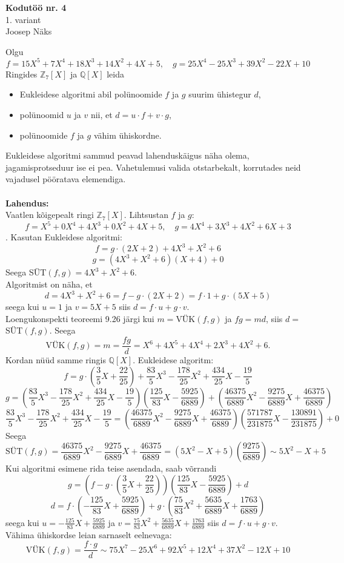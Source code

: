 \documentclass{article}
\begin{document}
\begin{center}
\Large\textbf{Kodutöö nr. 4}\\
1. variant\\
\small{Joosep Näks}
\end{center}
Olgu $$f=15X^5+7X^4+18X^3+14X^2+4X+5,\quad g=25X^4-25X^3+39X^2-22X+10$$ Ringides $\mathbb{Z}_7[X]$ ja $\mathbb{Q}[X]$ leida
\begin{itemize}
\item Eukleidese algoritmi abil polünoomide $f$ ja $g$ suurim ühistegur $d$,
\item polünoomid $u$ ja $v$ nii, et $d=u\cdot f+v\cdot g$,
\item polünoomide $f$ ja $g$ vähim ühiskordne.
\end{itemize}
Eukleidese algoritmi sammud peavad lahenduskäigus näha olema, jagamisprotseduur ise ei pea. Vahetulemusi valida otstarbekalt, korrutades neid vajadusel pööratava elemendiga.\\\\
\textbf{Lahendus:}\\
Vaatlen kõigepealt ringi $\mathbb{Z}_7[X]$. Lihtsustan $f$ ja $g$:$$f=X^5+0X^4+4X^3+0X^2+4X+5,\quad g=4X^4+3X^3+4X^2+6X+3$$. Kasutan Eukleidese algoritmi: $$f=g\cdot(2X+2)+4X^3+X^2+6$$$$g=(4X^3+X^2+6)(X+4)+0$$ Seega SÜT$(f,g)=4X^3+X^2+6$.\\
Algoritmist on näha, et $$d=4X^3+X^2+6=f-g\cdot(2X+2)=f\cdot1+g\cdot(5X+5)$$ seega kui $u=1$ ja $v=5X+5$ siis $d=f\cdot u+g\cdot v$.\\
Loengukonspekti teoreemi 9.26 järgi kui $m=$VÜK$(f,g)$ ja $fg=md$, siis $d=$SÜT$(f,g)$. Seega $$\text{VÜK}(f,g)=m=\frac{fg}{d}=X^6+4X^5+4X^4+2X^3+4X^2+6.$$
Kordan nüüd samme ringis $\mathbb{Q}[X]$. Eukleidese algoritm: $$f=g\cdot\left(\frac{3}{5}X+\frac{22}{25}\right)+\frac{83}{5}X^3-\frac{178}{25}X^2+\frac{434}{25}X-\frac{19}{5}$$$$g=\left(\frac{83}{5}X^3-\frac{178}{25}X^2+\frac{434}{25}X-\frac{19}{5}\right)\left(\frac{125}{83}X-\frac{5925}{6889}\right)+\left(\frac{46375}{6889}X^2-\frac{9275}{6889}X+\frac{46375}{6889}\right)$$
$$\frac{83}{5}X^3-\frac{178}{25}X^2+\frac{434}{25}X-\frac{19}{5}=\left(\frac{46375}{6889}X^2-\frac{9275}{6889}X+\frac{46375}{6889}\right)\left(\frac{571787}{231875}X-\frac{130891}{231875}\right)+0$$ Seega $$\text{SÜT}(f,g)=\frac{46375}{6889}X^2-\frac{9275}{6889}X+\frac{46375}{6889}=(5X^2-X+5)\left(\frac{9275}{6889}\right)\sim 5X^2-X+5$$
Kui algoritmi esimene rida teise asendada, saab võrrandi $$g=\left(f-g\cdot\left(\frac{3}{5}X+\frac{22}{25}\right)\right)\left(\frac{125}{83}X-\frac{5925}{6889}\right)+ d$$ $$d=f\cdot\left(-\frac{125}{83}X+\frac{5925}{6889}\right)+g\cdot\left(\frac{75}{83}X^2+\frac{5635}{6889}X+\frac{1763}{6889}\right)$$ seega kui $u=-\frac{125}{83}X+\frac{5925}{6889}$ ja $v=\frac{75}{83}X^2+\frac{5635}{6889}X+\frac{1763}{6889}$ siis $d=f\cdot u+g\cdot v$.\\
Vähima ühiskordse leian sarnaselt eelnevaga: $$\text{VÜK}(f,g)=\frac{f\cdot g}{d}\sim 75X^7-25X^6+92X^5+12X^4+37X^2-12X+10$$
\end{document}

